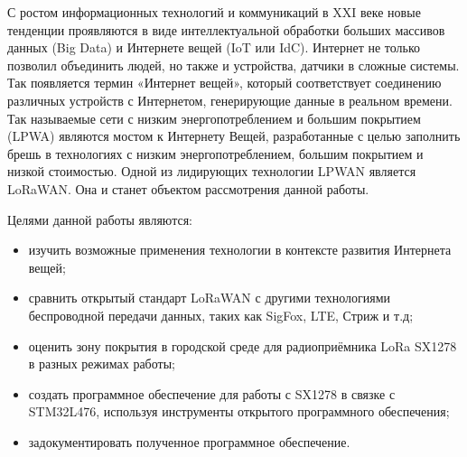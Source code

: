 \Introduction

С ростом информационных технологий и коммуникаций в XXI веке новые тенденции проявляются в виде интеллектуальной обработки больших массивов данных (Big Data) и Интернете вещей (IoT или IdC). 
Интернет не только позволил объединить людей, но также и устройства, датчики в сложные системы. 
Так появляется термин «Интернет вещей», который соответствует соединению различных устройств с Интернетом, генерирующие данные в реальном времени. 
Так называемые сети с низким энергопотреблением и большим покрытием (LPWA) являются мостом к Интернету Вещей, разработанные с целью заполнить брешь в технологиях с низким энергопотреблением, большим покрытием и низкой стоимостью. 
Одной из лидирующих технологии LPWAN является LoRaWAN. Она и станет объектом рассмотрения данной работы.

Целями данной работы являются:

\begin{itemize}
	\item изучить возможные применения технологии в контексте развития Интернета вещей;
	\item сравнить открытый стандарт LoRaWAN с другими технологиями беспроводной передачи данных, таких как SigFox, LTE, Стриж и т.д;
	\item оценить зону покрытия в городской среде для 
радиоприёмника LoRa SX1278 в разных режимах работы;
	\item создать программное обеспечение для работы с SX1278 в связке с
STM32L476, используя инструменты открытого программного обеспечения;
	\item задокументировать полученное программное обеспечение.
\end{itemize}


